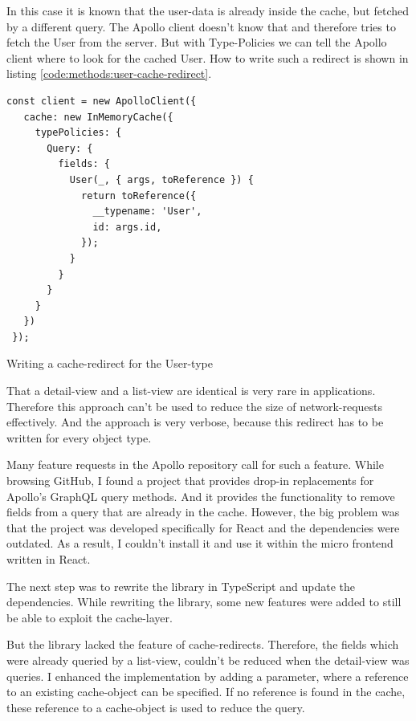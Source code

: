 In this case it is known that the user-data is already inside the cache, but fetched by a different query. The Apollo client doesn't know that and therefore tries to fetch the User from the server. But with Type-Policies we can tell the Apollo client where to look for the cached User. How to write such a redirect is shown in listing \ref{code:methods:user-cache-redirect}.

\ifshowListings
\begin{listing}[H]
\begin{verbatim}
const client = new ApolloClient({
   cache: new InMemoryCache({
     typePolicies: {
       Query: {
         fields: {
           User(_, { args, toReference }) {
             return toReference({
               __typename: 'User',
               id: args.id,
             });
           }
         }
       }
     }
   })
 });
\end{verbatim}
\caption{Writing a cache-redirect for the User-type}\label{code:methods:user-cache-redirect}
\end{listing}
\fi

That a detail-view and a list-view are identical is very rare in applications. Therefore this approach can't be used to reduce the size of network-requests effectively. And the approach is very verbose, because this redirect has to be written for every object type.

Many feature requests in the Apollo repository call for such a feature. While browsing GitHub, I found a project that provides drop-in replacements for Apollo's GraphQL query methods. And it provides the functionality to remove fields from a query that are already in the cache. However, the big problem was that the project was developed specifically for React and the dependencies were outdated. As a result, I couldn't install it and use it within the micro frontend written in React.

The next step was to rewrite the library in TypeScript and update the dependencies. While rewriting the library, some new features were added to still be able to exploit the cache-layer.

But the library lacked the feature of cache-redirects. Therefore, the fields which were already queried by a list-view, couldn't be reduced when the detail-view was queries. I enhanced the implementation by adding a parameter, where a reference to an existing cache-object can be specified. If no reference is found in the cache, these reference to a cache-object is used to reduce the query.

